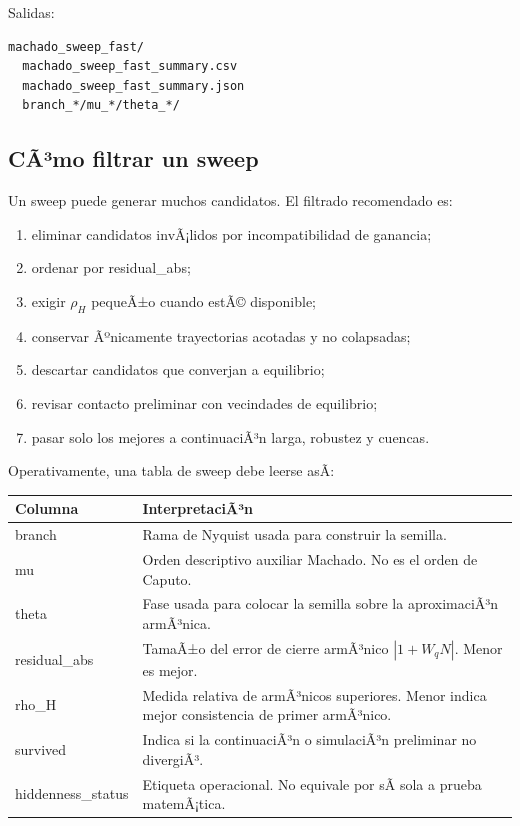 \documentclass[11pt]{article}
\DeclareRobustCommand{\codepath}[1]{\begingroup\Urlmuskip=0mu plus 2mu\path{#1}\endgroup}
\def\codepath#1{#1}%
\begin{document}
Salidas:

\begin{lstlisting}
machado_sweep_fast/
  machado_sweep_fast_summary.csv
  machado_sweep_fast_summary.json
  branch_*/mu_*/theta_*/
\end{lstlisting}

\subsection{CÃ³mo filtrar un sweep}

Un sweep puede generar muchos candidatos. El filtrado recomendado es:

\begin{enumerate}
\item eliminar candidatos invÃ¡lidos por incompatibilidad de ganancia;
\item ordenar por \codepath{residual_abs};
\item exigir \(\rho_H\) pequeÃ±o cuando estÃ© disponible;
\item conservar Ãºnicamente trayectorias acotadas y no colapsadas;
\item descartar candidatos que converjan a equilibrio;
\item revisar contacto preliminar con vecindades de equilibrio;
\item pasar solo los mejores a continuaciÃ³n larga, robustez y cuencas.
\end{enumerate}

Operativamente, una tabla de sweep debe leerse asÃ­:

\begin{center}
\small
\begin{tabular}{@{}L{0.30\textwidth}L{0.58\textwidth}@{}}
\toprule
Columna & InterpretaciÃ³n\\
\midrule
\codepath{branch} & Rama de Nyquist usada para construir la semilla.\\
\codepath{mu} & Orden descriptivo auxiliar Machado. No es el orden de Caputo.\\
\codepath{theta} & Fase usada para colocar la semilla sobre la aproximaciÃ³n armÃ³nica.\\
\codepath{residual_abs} & TamaÃ±o del error de cierre armÃ³nico \(|1+W_qN|\). Menor es mejor.\\
\codepath{rho_H} & Medida relativa de armÃ³nicos superiores. Menor indica mejor consistencia de primer armÃ³nico.\\
\codepath{survived} & Indica si la continuaciÃ³n o simulaciÃ³n preliminar no divergiÃ³.\\
\codepath{hiddenness_status} & Etiqueta operacional. No equivale por sÃ­ sola a prueba matemÃ¡tica.\\
\bottomrule
\end{tabular}
\end{center}
\end{document}
